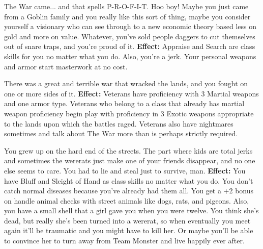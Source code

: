 \noindent{}

\medskip{}
{The War came... and that spells P-R-O-F-I-T. Hoo boy! Maybe you just came from a Goblin family and you really like this sort of thing, maybe you consider yourself a visionary who can see through to a new economic theory based less on gold and more on value. Whatever, you've sold people daggers to cut themselves out of snare traps, and you're proud of it.}
\textbf{Effect:}{ Appraise and Search are class skills for you no matter what you do. Also, you're a jerk. Your personal weapons and armor start masterwork at no cost.}

\medskip{}
{There was a great and terrible war that wracked the lands, and you fought on one or more sides of it.}
\textbf{Effect:}{ Veterans have proficiency with 3 Martial weapons and one armor type. Veterans who belong to a class that already has martial weapon proficiency begin play with proficiency in 3 Exotic weapons appropriate to the lands upon which the battles raged. Veterans also have nightmares sometimes and talk about The War more than is perhaps strictly required.}

\medskip{}
{You grew up on the hard end of the streets. The part where kids are total jerks and sometimes the wererats just make one of your friends disappear, and no one else seems to care. You had to lie and steal just to survive, man.}
\textbf{Effect:}{ You have Bluff and Sleight of Hand as class skills no matter what you do. You don't catch normal diseases because you've already had them all. You get a +2 bonus on handle animal checks with street animals like dogs, rats, and pigeons. Also, you have a small shell that a girl gave you when you were twelve. You think she's dead, but really she's been turned into a wererat, so when eventually you meet again it'll be traumatic and you might have to kill her. Or maybe you'll be able to convince her to turn away from Team Monster and live happily ever after.}

